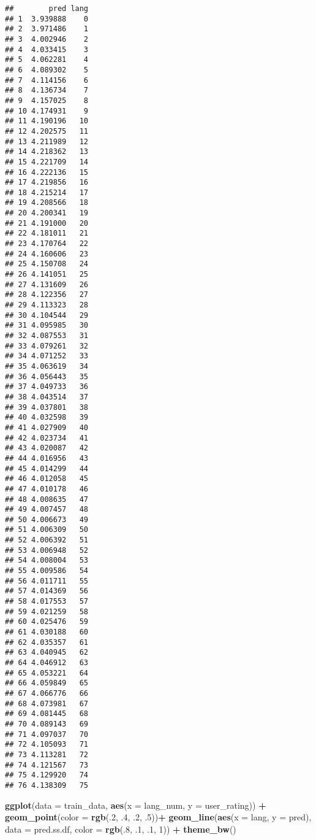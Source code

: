 \documentclass[]{article}
\newenvironment{Shaded}{\begin{snugshade}}{\end{snugshade}}
\newcommand{\KeywordTok}[1]{\textcolor[rgb]{0.13,0.29,0.53}{\textbf{#1}}}
\newcommand{\DataTypeTok}[1]{\textcolor[rgb]{0.13,0.29,0.53}{#1}}
\newcommand{\DecValTok}[1]{\textcolor[rgb]{0.00,0.00,0.81}{#1}}
\newcommand{\StringTok}[1]{\textcolor[rgb]{0.31,0.60,0.02}{#1}}
\newcommand{\OperatorTok}[1]{\textcolor[rgb]{0.81,0.36,0.00}{\textbf{#1}}}
\newcommand{\NormalTok}[1]{#1}
\begin{document}
\begin{verbatim}
##        pred lang
## 1  3.939888    0
## 2  3.971486    1
## 3  4.002946    2
## 4  4.033415    3
## 5  4.062281    4
## 6  4.089302    5
## 7  4.114156    6
## 8  4.136734    7
## 9  4.157025    8
## 10 4.174931    9
## 11 4.190196   10
## 12 4.202575   11
## 13 4.211989   12
## 14 4.218362   13
## 15 4.221709   14
## 16 4.222136   15
## 17 4.219856   16
## 18 4.215214   17
## 19 4.208566   18
## 20 4.200341   19
## 21 4.191000   20
## 22 4.181011   21
## 23 4.170764   22
## 24 4.160606   23
## 25 4.150708   24
## 26 4.141051   25
## 27 4.131609   26
## 28 4.122356   27
## 29 4.113323   28
## 30 4.104544   29
## 31 4.095985   30
## 32 4.087553   31
## 33 4.079261   32
## 34 4.071252   33
## 35 4.063619   34
## 36 4.056443   35
## 37 4.049733   36
## 38 4.043514   37
## 39 4.037801   38
## 40 4.032598   39
## 41 4.027909   40
## 42 4.023734   41
## 43 4.020087   42
## 44 4.016956   43
## 45 4.014299   44
## 46 4.012058   45
## 47 4.010178   46
## 48 4.008635   47
## 49 4.007457   48
## 50 4.006673   49
## 51 4.006309   50
## 52 4.006392   51
## 53 4.006948   52
## 54 4.008004   53
## 55 4.009586   54
## 56 4.011711   55
## 57 4.014369   56
## 58 4.017553   57
## 59 4.021259   58
## 60 4.025476   59
## 61 4.030188   60
## 62 4.035357   61
## 63 4.040945   62
## 64 4.046912   63
## 65 4.053221   64
## 66 4.059849   65
## 67 4.066776   66
## 68 4.073981   67
## 69 4.081445   68
## 70 4.089143   69
## 71 4.097037   70
## 72 4.105093   71
## 73 4.113281   72
## 74 4.121567   73
## 75 4.129920   74
## 76 4.138309   75
\end{verbatim}

\begin{Shaded}
\begin{Highlighting}[]
\KeywordTok{ggplot}\NormalTok{(}\DataTypeTok{data =}\NormalTok{ train_data, }\KeywordTok{aes}\NormalTok{(}\DataTypeTok{x =}\NormalTok{ lang_num, }\DataTypeTok{y =}\NormalTok{ user_rating)) }\OperatorTok{+}
\StringTok{     }\KeywordTok{geom_point}\NormalTok{(}\DataTypeTok{color =} \KeywordTok{rgb}\NormalTok{(.}\DecValTok{2}\NormalTok{, .}\DecValTok{4}\NormalTok{, .}\DecValTok{2}\NormalTok{, .}\DecValTok{5}\NormalTok{))}\OperatorTok{+}
\KeywordTok{geom_line}\NormalTok{(}\KeywordTok{aes}\NormalTok{(}\DataTypeTok{x =}\NormalTok{ lang, }\DataTypeTok{y =}\NormalTok{ pred), }\DataTypeTok{data =}\NormalTok{ pred.ss.df,}
          \DataTypeTok{color =} \KeywordTok{rgb}\NormalTok{(.}\DecValTok{8}\NormalTok{, .}\DecValTok{1}\NormalTok{, .}\DecValTok{1}\NormalTok{, }\DecValTok{1}\NormalTok{)) }\OperatorTok{+}\StringTok{ }\KeywordTok{theme_bw}\NormalTok{()}
\end{Highlighting}
\end{Shaded}
\end{document}
